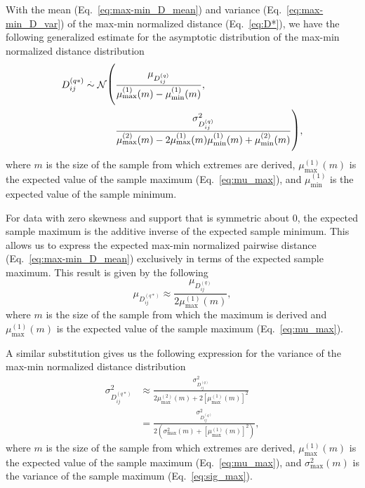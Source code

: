 \documentclass[aoas]{imsart}
\begin{document}
With the mean (Eq.~\ref{eq:max-min_D_mean}) and variance (Eq.~\ref{eq:max-min_D_var}) of the max-min normalized distance (Eq.~\ref{eq:D*}), we have the following generalized estimate for the asymptotic distribution of the max-min normalized distance distribution
%
\begin{equation}\label{eq:max-min-DDistr-general}
\begin{aligned}
D^{(q*)}_{ij} \overset{.}{\sim} \mathcal{N}{\fontsize{0.5cm}{1pt}\selectfont \Biggl(}&\frac{\mu_{D^{(q)}_{ij}}}{\mu^{(1)}_\text{max}(m) - \mu^{(1)}_\text{min}(m)}, \\
&\frac{\sigma^2_{D^{(q)}_{ij}}}{\mu^{(2)}_\text{max}(m) - 2 \mu^{(1)}_\text{max}(m) \mu^{(1)}_\text{min}(m) + \mu^{(2)}_\text{min}(m)}{\fontsize{0.5cm}{1pt}\selectfont \Biggr)},
\end{aligned}
\end{equation}
%
where $m$ is the size of the sample from which extremes are derived, $\mu^{(1)}_\text{max}(m)$ is the expected value of the sample maximum (Eq.~\ref{eq:mu_max}), and $\mu^{(1)}_\text{min}$ is the expected value of the sample minimum.

For data with zero skewness and support that is symmetric about 0, the expected sample maximum is the additive inverse of the expected sample minimum. This allows us to express the expected max-min normalized pairwise distance (Eq.~\ref{eq:max-min_D_mean}) exclusively in terms of the expected sample maximum. This result is given by the following
%
\begin{equation}\label{eq:max-min_D_mean_symm}
\mu_{D^{(q*)}_{ij}} \approx \frac{\mu_{D^{(q)}_{ij}}}{2\mu^{(1)}_\text{max}(m)},
\end{equation}
%
where $m$ is the size of the sample from which the maximum is derived and $\mu^{(1)}_\text{max}(m)$ is the expected value of the sample maximum (Eq.~\ref{eq:mu_max}).

A similar substitution gives us the following expression for the variance of the max-min normalized distance distribution
%
\begin{equation}\label{eq:max-min_D_var_symm}
\begin{aligned}
\sigma^2_{D^{(q*)}_{ij}} &\approx \frac{\sigma^2_{D^{(q)}_{ij}}}{2\mu^{(2)}_\text{max}(m) + 2\left[\mu^{(1)}_\text{max}(m)\right]^2} \\
&= \frac{\sigma^2_{D^{(q)}_{ij}}}{2\left(\sigma^2_\text{max}(m) + \left[\mu^{(1)}_\text{max}(m)\right]^2\right)},
\end{aligned}
\end{equation}
%
where $m$ is the size of the sample from which extremes are derived, $\mu^{(1)}_\text{max}(m)$ is the expected value of the sample maximum (Eq.~\ref{eq:mu_max}), and $\sigma^2_\text{max}(m)$ is the variance of the sample maximum (Eq.~\ref{eq:sig_max}).
\end{document}
